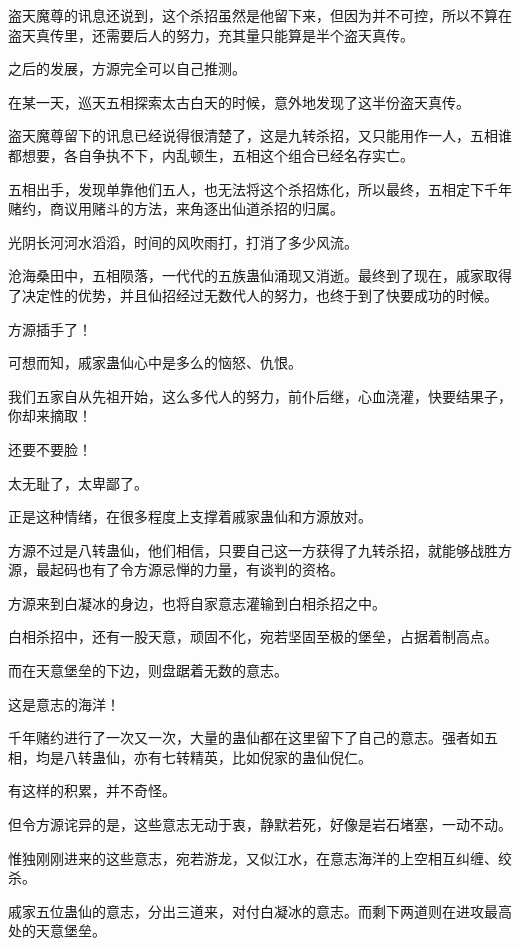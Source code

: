 \begin{this_body}
盗天魔尊的讯息还说到，这个杀招虽然是他留下来，但因为并不可控，所以不算在盗天真传里，还需要后人的努力，充其量只能算是半个盗天真传。

之后的发展，方源完全可以自己推测。

在某一天，巡天五相探索太古白天的时候，意外地发现了这半份盗天真传。

盗天魔尊留下的讯息已经说得很清楚了，这是九转杀招，又只能用作一人，五相谁都想要，各自争执不下，内乱顿生，五相这个组合已经名存实亡。

五相出手，发现单靠他们五人，也无法将这个杀招炼化，所以最终，五相定下千年赌约，商议用赌斗的方法，来角逐出仙道杀招的归属。

光阴长河河水滔滔，时间的风吹雨打，打消了多少风流。

沧海桑田中，五相陨落，一代代的五族蛊仙涌现又消逝。最终到了现在，戚家取得了决定性的优势，并且仙招经过无数代人的努力，也终于到了快要成功的时候。

方源插手了！

可想而知，戚家蛊仙心中是多么的恼怒、仇恨。

我们五家自从先祖开始，这么多代人的努力，前仆后继，心血浇灌，快要结果子，你却来摘取！

还要不要脸！

太无耻了，太卑鄙了。

正是这种情绪，在很多程度上支撑着戚家蛊仙和方源放对。

方源不过是八转蛊仙，他们相信，只要自己这一方获得了九转杀招，就能够战胜方源，最起码也有了令方源忌惮的力量，有谈判的资格。

方源来到白凝冰的身边，也将自家意志灌输到白相杀招之中。

白相杀招中，还有一股天意，顽固不化，宛若坚固至极的堡垒，占据着制高点。

而在天意堡垒的下边，则盘踞着无数的意志。

这是意志的海洋！

千年赌约进行了一次又一次，大量的蛊仙都在这里留下了自己的意志。强者如五相，均是八转蛊仙，亦有七转精英，比如倪家的蛊仙倪仁。

有这样的积累，并不奇怪。

但令方源诧异的是，这些意志无动于衷，静默若死，好像是岩石堵塞，一动不动。

惟独刚刚进来的这些意志，宛若游龙，又似江水，在意志海洋的上空相互纠缠、绞杀。

戚家五位蛊仙的意志，分出三道来，对付白凝冰的意志。而剩下两道则在进攻最高处的天意堡垒。


\end{this_body}
